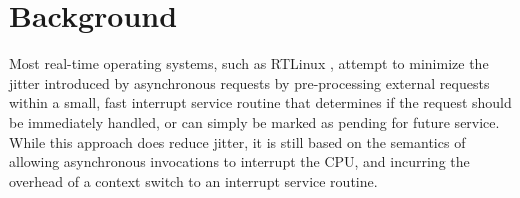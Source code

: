 \chapter{Background}
\label{sec:back}
Most real-time
operating systems, such as RTLinux \cite{yodaiken99rtlinux}, attempt to
minimize the jitter introduced by asynchronous requests by pre-processing
external requests within a small, fast interrupt service routine that
determines if the request should be immediately handled, or can simply be
marked as pending for future service.  While this approach does reduce
jitter, it is still based on the semantics of allowing asynchronous
invocations to interrupt the CPU, and incurring the overhead of a context
switch to an interrupt service routine.

